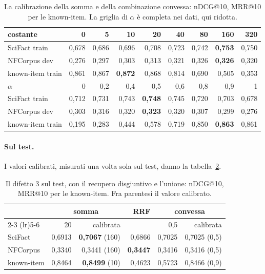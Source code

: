 \begin{table}[ht]
  \centering
  \small
  \setlength{\tabcolsep}{4pt}
  \begin{tabular}{lrrrrrrrr}
    \toprule
    costante & 0 & 5 & 10 & 20 & 40 & 80 & 160 & 320 \\
    \midrule
    SciFact train & 0,678 & 0,686 & 0,696 & 0,708 & 0,723 & 0,742 & \textbf{0,753} & 0,750 \\
    NFCorpus dev & 0,276 & 0,297 & 0,303 & 0,313 & 0,321 & 0,326 & \textbf{0,326} & 0,320 \\
    known-item train & 0,861 & 0,867 & \textbf{0,872} & 0,868 & 0,814 & 0,690 & 0,505 & 0,353 \\
    \midrule
    $\alpha$ & 0 & 0,2 & 0,4 & 0,5 & 0,6 & 0,8 & 0,9 & 1 \\
    \midrule
    SciFact train & 0,712 & 0,731 & 0,743 & \textbf{0,748} & 0,745 & 0,720 & 0,703 & 0,678 \\
    NFCorpus dev & 0,303 & 0,316 & 0,320 & \textbf{0,323} & 0,320 & 0,307 & 0,299 & 0,276 \\
    known-item train & 0,195 & 0,283 & 0,444 & 0,578 & 0,719 & 0,850 & \textbf{0,863} & 0,861 \\
    \bottomrule
  \end{tabular}
  \caption{La calibrazione della somma e della combinazione convessa: nDCG@10, MRR@10
  per le known-item. La griglia di $\alpha$ è completa nei dati, qui ridotta.}
  \label{tab:calibrazione}
\end{table}

\paragraph{Sul test.} I valori calibrati, misurati una volta sola sul test, danno la
tabella~\ref{tab:difetto3}.

\begin{table}[ht]
  \centering
  \small
  \begin{tabular}{lrrrrr}
    \toprule
    & \multicolumn{2}{c}{somma} & RRF & \multicolumn{2}{c}{convessa} \\
    \cmidrule(lr){2-3} \cmidrule(lr){5-6}
    & 20 & calibrata & & 0,5 & calibrata \\
    \midrule
    SciFact & 0,6913 & \textbf{0,7067} (160) & 0,6866 & 0,7025 & 0,7025 (0,5) \\
    NFCorpus & 0,3340 & 0,3441 (160) & \textbf{0,3447} & 0,3416 & 0,3416 (0,5) \\
    known-item & 0,8464 & \textbf{0,8499} (10) & 0,4623 & 0,5723 & 0,8466 (0,9) \\
    \bottomrule
  \end{tabular}
  \caption{Il difetto 3 sul test, con il recupero disgiuntivo e l'unione: nDCG@10,
  MRR@10 per le known-item. Fra parentesi il valore calibrato.}
  \label{tab:difetto3}
\end{table}

